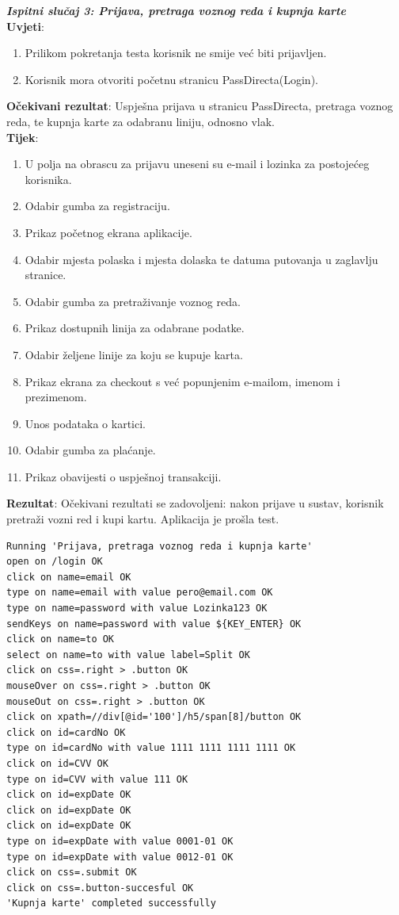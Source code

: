 {{{\noindent \textbf{\textit{Ispitni slučaj 3: Prijava, pretraga voznog reda i kupnja karte}}\\
\textbf{Uvjeti}:
			 \begin{enumerate}
				\item Prilikom pokretanja testa korisnik ne smije već biti prijavljen.
				\item Korisnik mora otvoriti početnu stranicu PassDirecta(Login).
			 \end{enumerate}
\textbf{Očekivani rezultat}: Uspješna prijava u stranicu PassDirecta, pretraga voznog reda, te kupnja karte za odabranu liniju, odnosno vlak.\\
\textbf{Tijek}:
			 \begin{enumerate}
			 	\item U polja na obrascu za prijavu uneseni su e-mail i lozinka za postojećeg korisnika.
			 	\item Odabir gumba za registraciju.
			 	\item Prikaz početnog ekrana aplikacije.
				\item Odabir mjesta polaska i mjesta dolaska te datuma putovanja u zaglavlju stranice.
				\item Odabir gumba za pretraživanje voznog reda.
				\item Prikaz dostupnih linija za odabrane podatke.
				\item Odabir željene linije za koju se kupuje karta.
				\item Prikaz ekrana za checkout s već popunjenim e-mailom, imenom i prezimenom.
				\item Unos podataka o kartici.
				\item Odabir gumba za plaćanje.
				\item Prikaz obavijesti o uspješnoj transakciji.
			 \end{enumerate}
			 \noindent \textbf{Rezultat}:
			 Očekivani rezultati se zadovoljeni: nakon prijave u sustav, korisnik pretraži vozni red i kupi kartu. Aplikacija je prošla test. \\




\begin{lstlisting}
Running 'Prijava, pretraga voznog reda i kupnja karte'
open on /login OK
click on name=email OK
type on name=email with value pero@email.com OK
type on name=password with value Lozinka123 OK
sendKeys on name=password with value ${KEY_ENTER} OK
click on name=to OK
select on name=to with value label=Split OK
click on css=.right > .button OK
mouseOver on css=.right > .button OK
mouseOut on css=.right > .button OK
click on xpath=//div[@id='100']/h5/span[8]/button OK
click on id=cardNo OK
type on id=cardNo with value 1111 1111 1111 1111 OK
click on id=CVV OK
type on id=CVV with value 111 OK
click on id=expDate OK
click on id=expDate OK
click on id=expDate OK
type on id=expDate with value 0001-01 OK
type on id=expDate with value 0012-01 OK
click on css=.submit OK
click on css=.button-succesful OK
'Kupnja karte' completed successfully
\end{lstlisting}}\hfill\break






}}
